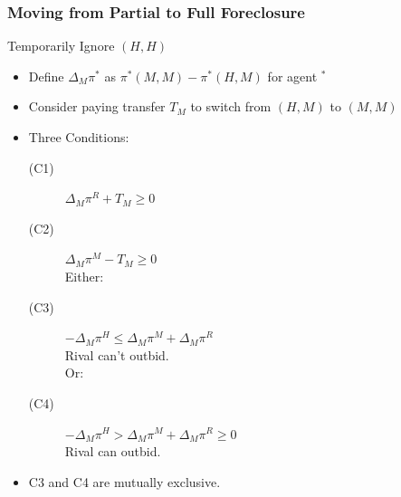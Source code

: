 \documentclass[aspectratio=169,11pt]{beamer}
\begin{document}
\begin{frame}
\frametitle{Moving from Partial to Full Foreclosure}
Temporarily Ignore $(H,H)$
\begin{itemize}
\item Define $\Delta_M \pi^{*}$ as $\pi^*(M,M) - \pi^*(H,M)$ for agent $ ^*$ 
\item Consider paying transfer $T_M$ to switch from $(H,M)$ to $(M,M)$
\item Three Conditions:
\begin{description}
\item[(C1)] $\Delta_M \pi^R+ T_M \geq 0$
\item[(C2)] $\Delta_M \pi^M - T_M \geq 0$\\
\hspace{-0.8in}Either:
\item[(C3)]  $-\Delta_M \pi^H  \leq \Delta_M \pi^M + \Delta_M \pi^R$ \\
Rival can't outbid.\\
\hspace{-0.8in}Or:
\item[(C4)] $-\Delta_M \pi^H  > \Delta_M \pi^M + \Delta_M \pi^R \geq 0$\\
Rival can outbid.
\end{description}
\item C3 and C4 are mutually exclusive. 
\end{itemize}
\end{frame}
\end{document}
